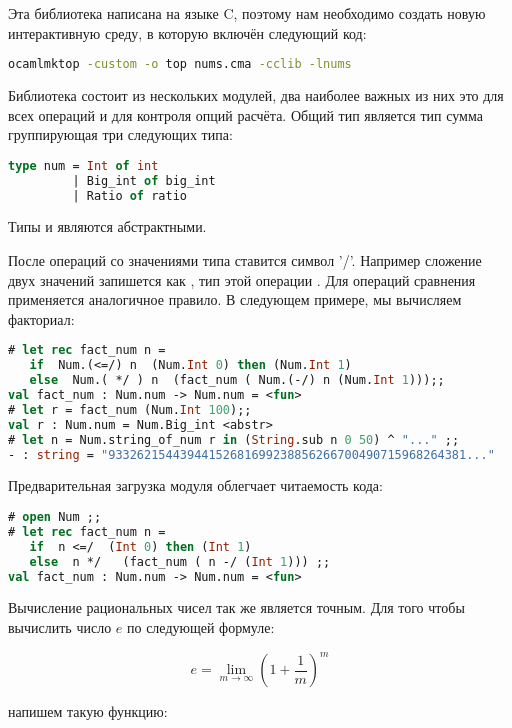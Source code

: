 Эта библиотека написана на языке C, поэтому нам необходимо создать новую 
интерактивную среду, в которую включён следующий код:

\begin{lstlisting}[language=Bash]
ocamlmktop -custom -o top nums.cma -cclib -lnums
\end{lstlisting}

Библиотека состоит из нескольких модулей, два наиболее важных из них это 
 для всех операций и  для контроля опций расчёта. 
Общий тип  является тип сумма группирующая три следующих типа: 

\begin{lstlisting}[language=OCaml]
type num = Int of int
         | Big_int of big_int 
         | Ratio of ratio
\end{lstlisting}

Типы  и  являются абстрактными.

После операций со значениями типа  ставится символ '/'. Например 
сложение двух значений  запишется как \code{+/}, тип этой операции 
. Для операций сравнения применяется аналогичное 
правило. В следующем примере, мы вычисляем факториал:

\begin{lstlisting}[language=OCaml]
# let rec fact_num n = 
   if  Num.(<=/) n  (Num.Int 0) then (Num.Int 1) 
   else  Num.( */ ) n  (fact_num ( Num.(-/) n (Num.Int 1)));;
val fact_num : Num.num -> Num.num = <fun>
# let r = fact_num (Num.Int 100);;
val r : Num.num = Num.Big_int <abstr>
# let n = Num.string_of_num r in (String.sub n 0 50) ^ "..." ;;
- : string = "93326215443944152681699238856266700490715968264381..."
\end{lstlisting}

Предварительная загрузка модуля  облегчает читаемость кода:

\begin{lstlisting}[language=OCaml]
# open Num ;;
# let rec fact_num n = 
   if  n <=/  (Int 0) then (Int 1) 
   else  n */   (fact_num ( n -/ (Int 1))) ;;
val fact_num : Num.num -> Num.num = <fun>
\end{lstlisting}

Вычисление рациональных чисел так же является точным. Для того чтобы вычислить 
число $e$ по следующей формуле:

$$
e = \lim_{m \to \infty} \left(1 + \frac1m \right)^m
$$

напишем такую функцию:

